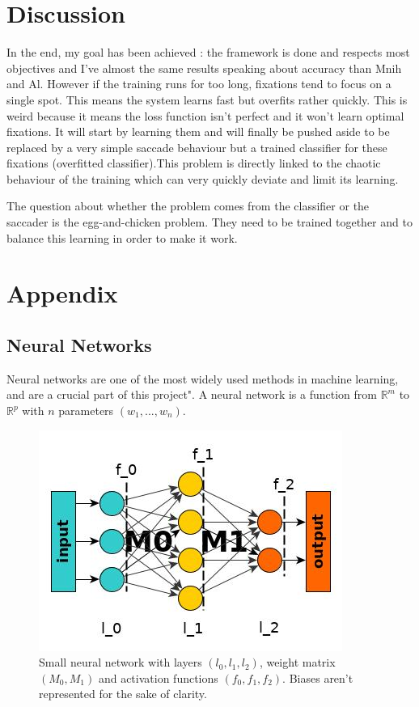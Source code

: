 \documentclass[11pt]{article}
\begin{document}
\section{Discussion}
In the end, my goal has been achieved : the framework is done and respects most objectives and I've almost the same results speaking about accuracy than Mnih and Al. However if the training runs for too long, fixations tend to focus on a single spot. This means the system learns fast but overfits rather quickly. This is weird because it means the loss function isn't perfect and it won't learn optimal fixations. It will start by learning them and will finally be pushed aside to be replaced by a very simple saccade behaviour but a trained classifier for these fixations (overfitted classifier).This problem is directly linked to the chaotic behaviour of the training which can very quickly deviate and limit its learning.

The question about whether the problem comes from the classifier or the saccader is the egg-and-chicken problem. They need to be trained together and to balance this learning in order to make it work. 



\newpage
\section{Appendix}
\subsection{Neural Networks}
Neural networks are one of the most widely used methods in machine learning, and are a crucial part of this project". A neural network is a function from $\mathbb{R}^m$ to $\mathbb{R}^p$ with $n$ parameters $(w_1,...,w_n)$.
\begin{figure}[h]
\centering
\includegraphics[scale=0.40]{layers.jpg}
\caption{Small neural network with layers $(l_0,l_1,l_2)$, weight matrix $(M_0,M_1)$ and activation functions $(f_0,f_1,f_2)$. Biases aren't represented for the sake of clarity.}
\label{layers}
\end{figure}
\end{document}
